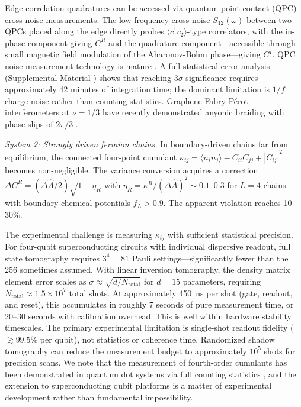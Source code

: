 \documentclass[aps,prd,reprint,superscriptaddress,twocolumn]{revtex4-2}
\begin{document}
Edge correlation quadratures can be accessed via quantum point contact (QPC) cross-noise measurements. The low-frequency cross-noise $S_{12}(\omega)$ between two QPCs placed along the edge directly probes $\langle c^\dagger_1 c_2\rangle$-type correlators, with the in-phase component giving $C^R$ and the quadrature component---accessible through small magnetic field modulation of the Aharonov-Bohm phase---giving $C^I$. QPC noise measurement technology is mature \cite{Heiblum}. A full statistical error analysis (Supplemental Material \cite{SM}) shows that reaching $3\sigma$ significance requires approximately 42 minutes of integration time; the dominant limitation is $1/f$ charge noise rather than counting statistics. Graphene Fabry-P\'{e}rot interferometers at $\nu = 1/3$ have recently demonstrated anyonic braiding with phase slips of $2\pi/3$ \cite{Werkmeister2025,Samuelson2024}.

\textit{System 2: Strongly driven fermion chains.} In boundary-driven chains far from equilibrium, the connected four-point cumulant $\kappa_{ij} = \langle n_i n_j\rangle - C_{ii}C_{jj} + |C_{ij}|^2$ becomes non-negligible. The variance conversion acquires a correction $\Delta C^R = (\Delta\hat{A}/2)\sqrt{1+\eta_R}$ with $\eta_R = \kappa^R/(\Delta\hat{A})^2 \sim 0.1$--$0.3$ for $L = 4$ chains with boundary chemical potentials $f_L > 0.9$. The apparent violation reaches 10--30\%.

The experimental challenge is measuring $\kappa_{ij}$ with sufficient statistical precision. For four-qubit superconducting circuits with individual dispersive readout, full state tomography requires $3^4 = 81$ Pauli settings---significantly fewer than the 256 sometimes assumed. With linear inversion tomography, the density matrix element error scales as $\sigma \approx \sqrt{d/N_{\text{total}}}$ for $d = 15$ parameters, requiring $N_{\text{total}} \approx 1.5 \times 10^7$ total shots. At approximately 450~ns per shot (gate, readout, and reset), this accumulates in roughly 7 seconds of pure measurement time, or 20--30 seconds with calibration overhead. This is well within hardware stability timescales. The primary experimental limitation is single-shot readout fidelity ($\gtrsim 99.5\%$ per qubit), not statistics or coherence time. Randomized shadow tomography \cite{Huang2020} can reduce the measurement budget to approximately $10^5$ shots for precision scans. We note that the measurement of fourth-order cumulants has been demonstrated in quantum dot systems via full counting statistics \cite{LevitovLesovik1993}, and the extension to superconducting qubit platforms is a matter of experimental development rather than fundamental impossibility.
\end{document}
